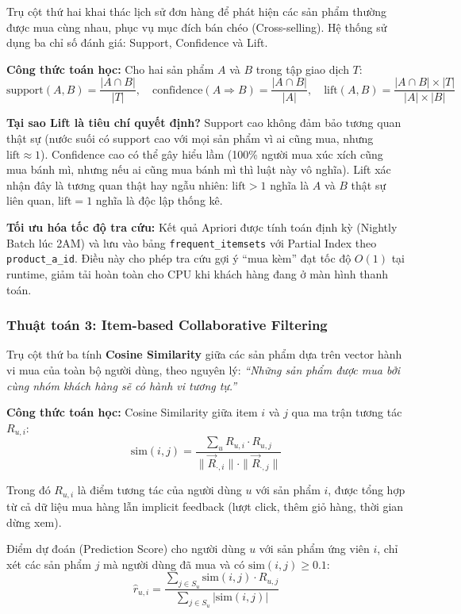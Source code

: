 \documentclass[12pt,a4paper]{report}
\begin{document}
Trụ cột thứ hai khai thác lịch sử đơn hàng để phát hiện các sản phẩm thường được mua cùng nhau, phục vụ mục đích bán chéo (Cross-selling). Hệ thống sử dụng ba chỉ số đánh giá: Support, Confidence và Lift.
 
\textbf{Công thức toán học:} Cho hai sản phẩm $A$ và $B$ trong tập giao dịch $T$:
\[
\text{support}(A, B) = \frac{|A \cap B|}{|T|}, \quad
\text{confidence}(A \Rightarrow B) = \frac{|A \cap B|}{|A|}, \quad
\text{lift}(A, B) = \frac{|A \cap B| \times |T|}{|A| \times |B|}
\]
 
\textbf{Tại sao Lift là tiêu chí quyết định?} Support cao không đảm bảo tương quan thật sự (nước suối có support cao với mọi sản phẩm vì ai cũng mua, nhưng $\text{lift} \approx 1$). Confidence cao có thể gây hiểu lầm (100\% người mua xúc xích cũng mua bánh mì, nhưng nếu ai cũng mua bánh mì thì luật này vô nghĩa). Lift xác nhận đây là tương quan thật hay ngẫu nhiên: $\text{lift} > 1$ nghĩa là $A$ và $B$ thật sự liên quan, $\text{lift} = 1$ nghĩa là độc lập thống kê.
 
\textbf{Tối ưu hóa tốc độ tra cứu:} Kết quả Apriori được tính toán định kỳ (Nightly Batch lúc 2AM) và lưu vào bảng \texttt{frequent\_itemsets} với Partial Index theo \texttt{product\_a\_id}. Điều này cho phép tra cứu gợi ý ``mua kèm'' đạt tốc độ $O(1)$ tại runtime, giảm tải hoàn toàn cho CPU khi khách hàng đang ở màn hình thanh toán.
 
\subsubsection{Thuật toán 3: Item-based Collaborative Filtering}
 
Trụ cột thứ ba tính \textbf{Cosine Similarity} giữa các sản phẩm dựa trên vector hành vi mua của toàn bộ người dùng, theo nguyên lý: \textit{``Những sản phẩm được mua bởi cùng nhóm khách hàng sẽ có hành vi tương tự.''}
 
\textbf{Công thức toán học:} Cosine Similarity giữa item $i$ và $j$ qua ma trận tương tác $R_{u,i}$:
\[
\text{sim}(i, j) = \frac{\sum_u R_{u,i} \cdot R_{u,j}}{\|\vec{R}_{\cdot,i}\| \cdot \|\vec{R}_{\cdot,j}\|}
\]
 
Trong đó $R_{u,i}$ là điểm tương tác của người dùng $u$ với sản phẩm $i$, được tổng hợp từ cả dữ liệu mua hàng lẫn implicit feedback (lượt click, thêm giỏ hàng, thời gian dừng xem).
 
Điểm dự đoán (Prediction Score) cho người dùng $u$ với sản phẩm ứng viên $i$, chỉ xét các sản phẩm $j$ mà người dùng đã mua và có $\text{sim}(i,j) \geq 0.1$:
\[
\hat{r}_{u,i} = \frac{\sum_{j \in S_u} \text{sim}(i,j) \cdot R_{u,j}}{\sum_{j \in S_u} |\text{sim}(i,j)|}
\]
 
\end{document}
